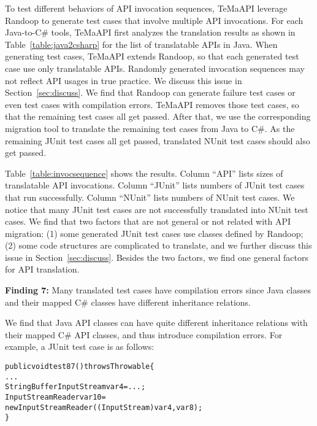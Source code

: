 To test different behaviors of API invocation sequences, TeMaAPI leverage Randoop to generate test cases that involve multiple API invocations. For each Java-to-C\# tools, TeMaAPI first analyzes the translation results as shown in Table~\ref{table:java2csharp} for the list of translatable APIs in Java. When generating test cases, TeMaAPI extends Randoop, so that each generated test case use only translatable APIs. Randomly generated invocation sequences may not reflect API usages in true practice. We discuss this issue in Section~\ref{sec:discuss}. We find that Randoop can generate failure test cases or even test cases with compilation errors. TeMaAPI removes those test cases, so that the remaining test cases all get passed. After that, we use the corresponding migration tool to translate the remaining test cases from Java to C\#. As the remaining JUnit test cases all get passed, translated NUnit test cases should also get passed.

Table~\ref{table:invocsequence} shows the results. Column ``API'' lists sizes of translatable API invocations. Column ``JUnit'' lists numbers of JUnit test cases that run successfully. Column ``NUnit'' lists numbers of NUnit test cases. We notice that many JUnit test cases are not successfully translated into NUnit test cases. We find that two factors that are not general or not related with API migration: (1) some generated JUnit test cases use classes defined by Randoop; (2) some code structures are complicated to translate, and we further discuss this issue in Section~\ref{sec:discuss}. Besides the two factors, we find one general factors for API translation.

\textbf{Finding 7:} Many translated test cases have compilation errors since Java classes and their mapped C\# classes have different inheritance relations.

We find that Java API classes can have quite different inheritance relations with their mapped C\# API classes, and thus introduce compilation errors. For example, a JUnit test case is as follows:

\begin{CodeOut}%
\begin{alltt}
public void test87() throws Throwable\{
  ...
  StringBufferInputStream var4=...;
  InputStreamReader var10=
    new InputStreamReader((InputStream)var4, var8);
\}
\end{alltt}
\end{CodeOut}

